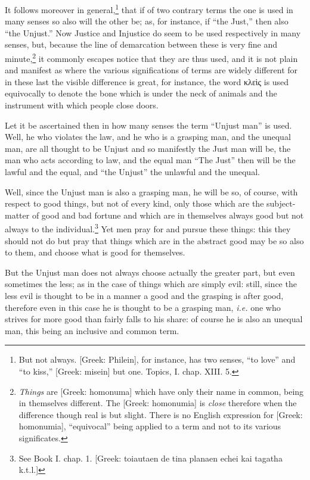 It follows moreover in general,\footnote{But not always. [Greek: Philein], for instance, has two senses, “to
love” and “to kiss,” [Greek: misein] but one. Topics, I.
chap. XIII. 5.}
that if of two contrary terms the one is used in many senses so also will the
other be; as, for instance, if “the Just,” then also “the
Unjust.” Now Justice and Injustice do seem to be used respectively in
many senses, but, because the line of demarcation between these is very fine
and minute,\footnote{\emph{Things} are [Greek: homonuma] which have only their name in common, being
in themselves different. The [Greek: homonumia] is \emph{close} therefore when
the difference though real is but slight. There is no English expression for
[Greek: homonumia], “equivocal” being applied to a term and not to
its various significates.}
it commonly escapes notice that they are thus used, and it is not plain and
manifest as where the various significations of terms are widely different for
in these last the visible difference is great, for instance, the word
κλεὶς is used equivocally to denote the bone which is
under the neck of animals and the instrument with which people close doors.

Let it be ascertained then in how many senses the term “Unjust man”
is used. Well, he who violates the law, and he who is a grasping man, and the
unequal man, are all thought to be Unjust and so manifestly the Just man will
be, the man who acts according to law, and the equal man “The Just”
then will be the lawful and the equal, and “the Unjust” the
unlawful and the unequal.

Well, since the Unjust man is also a grasping man, he will be so, of course,
with respect to good things, but not of every kind, only those which are the
subject-matter of good and bad fortune and which are in themselves always good
but not always to the individual.\footnote{See Book I. chap. 1. [Greek: toiautaen de tina planaen echei kai tagatha
k.t.l.]}
Yet men pray for and pursue these things: this they should not do but pray that
things which are in the abstract good may be so also to them, and choose what
is good for themselves.

But the Unjust man does not always choose actually the greater part, but even
sometimes the less; as in the case of things which are simply evil: still,
since the less evil is thought to be in a manner a good and the grasping is
after good, therefore even in this case he is thought to be a grasping man,
\emph{i.e.} one who strives for more good than fairly falls to his share: of
course he is also an unequal man, this being an inclusive and common term.

